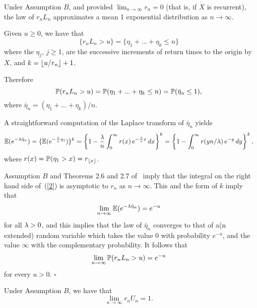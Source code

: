 \begin{lm}
\label{lm:approx}
Under Assumption  $B$, and provided $\lim_{n\to\infty}r_n=0$ (that is, if $X$ is recurrent), the law of $r_n L_n$ approximates a mean 1 exponential
distribution as $n\to\infty$. 
\end{lm}


Given $u\geq0$, we have that
$$ \{r_n L_n>u\}=\{\eta_1+...+\eta_k\leq n\} $$ 
where the $\eta_j$, $j\geq1$, are the successive  increments of return times to the origin by $X$, and $k=\lfloor u/r_n\rfloor+1$. 

Therefore 
\begin{equation} \label{1}
\P(r_n L_n>u)=\P(\eta_1+...+\eta_k\leq n)=\P(\bar\eta_n\leq1),
\end{equation} 
where $\bar\eta_n=(\eta_1+...+\eta_k)/n$.

A straightforward computation of the Laplace transform of $\bar\eta_n$ yields
\begin{equation} \label{2}
\esp(e^{-\l\bar\eta_n})=\{\esp(e^{-\frac\l n\eta_1})\}^k=\left\{1-\frac\l n\int_0^\infty r(x)\,e^{-\frac\l n x}\,dx\right\}^k
=\left\{1-\int_0^\infty r(y n/\l)\,e^{-y}\,dy\right\}^k,
\end{equation} 
where  $r(x)={\mathbb P}(\eta_1>x)=r_{\lfloor x\rfloor}$.

Assumption  $B$ and Theorems 2.6 and 2.7 of~\cite{kn:Se} imply that the integral on the right hand side of~(\ref{2}) is asymptotic
to $r_n$ as $n\to\infty$. This and the form of $k$ imply that
\begin{equation} \label{3}
\lim_{n\to\infty}\esp(e^{-\l\bar\eta_n})=e^{-u}
\end{equation} 
for all $\lambda>0$, and this implies that the law of $\bar\eta_n$ converges to that of a(n extended) random variable which takes the value $0$
with probability $e^{-u}$, and the value $\infty$ with the complementary probability. It follows that 
\begin{equation} \label{4}
\lim_{n\to\infty}\P(r_n L_n>u)=e^{-u}
\end{equation} 
for every $u>0$. $\square$

\begin{cor}
\label{cor:approx}
Under Assumption $B$, we have that
\begin{equation} \label{5}
\lim_{n\to\infty}r_n U_n=1.
\end{equation} 
\end{cor}



